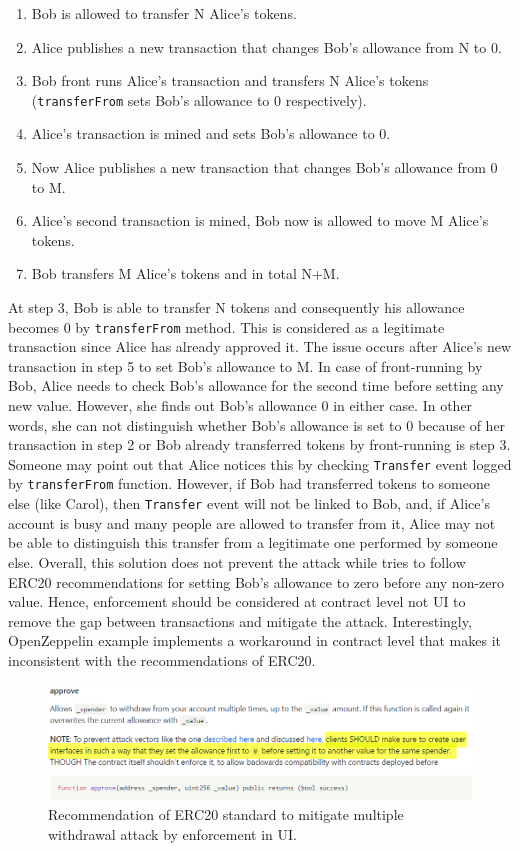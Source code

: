 \begin{enumerate}
	\item Bob is allowed to transfer N Alice’s tokens.
	\item Alice publishes a new transaction that changes Bob’s allowance from N to 0.
	\item Bob front runs Alice’s transaction and transfers N Alice’s tokens (\texttt{transferFrom} sets Bob’s allowance to 0 respectively).
	\item Alice’s transaction is mined and sets Bob’s allowance to 0.
	\item Now Alice publishes a new transaction that changes Bob’s allowance from 0 to M.
	\item Alice’s second transaction is mined, Bob now is allowed to move M Alice’s tokens.
	\item Bob transfers M Alice’s tokens and in total N+M.\newline
\end{enumerate}
At step 3, Bob is able to transfer N tokens and consequently his allowance becomes 0 by \texttt{transferFrom} method. This is considered as a legitimate transaction since Alice has already approved it. The issue occurs after Alice’s new transaction in step 5 to set Bob's allowance to M. In case of front-running by Bob, Alice needs to check Bob’s allowance for the second time before setting any new value. However, she finds out Bob’s allowance 0 in either case. In other words, she can not distinguish whether Bob’s allowance is set to 0 because of her transaction in step 2 or Bob already transferred tokens by front-running is step 3. Someone may point out that Alice notices this by checking \texttt{Transfer} event logged by \texttt{transferFrom} function. However, if Bob had transferred tokens to someone else (like Carol), then \texttt{Transfer} event will not be linked to Bob, and, if Alice’s account is busy and many people are allowed to transfer from it, Alice may not be able to distinguish this transfer from a legitimate one performed by someone else. Overall, this solution does not prevent the attack while tries to follow ERC20 recommendations for setting Bob’s allowance to zero before any non-zero value. Hence, enforcement should be considered at contract level not UI to remove the gap between transactions and mitigate the attack. Interestingly, OpenZeppelin example implements a workaround in contract level that makes it inconsistent with the recommendations of ERC20.
\begin{figure}[t!]
	\centering
	\includegraphics[width=1.0\linewidth]{figures/multiple_withdrawal_03.png}
	\caption{Recommendation of ERC20 standard to mitigate multiple withdrawal attack by enforcement in UI.\label{fig:uie}}
\end{figure}

